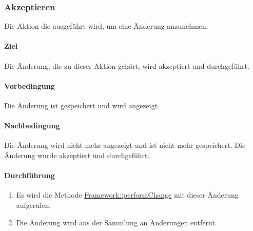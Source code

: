 \subsubsection{Akzeptieren}\label{AP_Aktionen_Anderungen_Akzeptieren}

Die Aktion die ausgeführt wird, um eine Änderung anzunehmen.

\paragraph*{Ziel}
Die Änderung, die zu dieser Aktion gehört, wird akzeptiert und durchgeführt.

\paragraph*{Vorbedingung}
Die Änderung ist gespeichert und wird angezeigt.

\paragraph*{Nachbedingung}
Die Änderung wird nicht mehr angezeigt und ist nicht mehr gespeichert. Die Änderung wurde akzeptiert und durchgeführt.

\paragraph*{Durchführung}
\begin{enumerate}
    \item Es wird die Methode \hyperref[AP_Framework_performChange]{Framework::performChange} mit dieser Änderung aufgerufen.
    \item Die Änderung wird aus der Sammlung an Änderungen entfernt.
\end{enumerate}